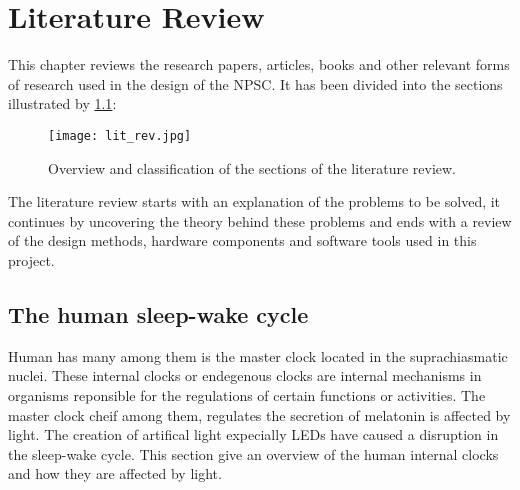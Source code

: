 \chapter{Literature Review}

This chapter reviews the research papers, articles, books and other relevant forms of research used in the design of the NPSC. It has been divided into the sections illustrated by \cref{fig:lit_rev}:
\begin{figure}[h!]
\centering
\texttt{[image: lit\_rev.jpg]}
\caption{Overview and classification of the sections of the literature review.}
\label{fig:lit_rev}
\end{figure}
The literature review starts with an explanation of the problems to be solved, it continues by uncovering the theory behind these problems and ends with a review of the design methods, hardware components and software tools used in this project.
\section{The human sleep-wake cycle}

Human has many  among them is the master clock located in the suprachiasmatic nuclei. These internal clocks or endegenous clocks are internal mechanisms in organisms reponsible for the regulations of certain functions or activities. The master clock cheif among them, regulates the secretion of melatonin is affected by light. The creation of artifical light expecially LEDs have caused a disruption in the sleep-wake cycle. This section give an overview of the human internal clocks and how they are affected by light.

